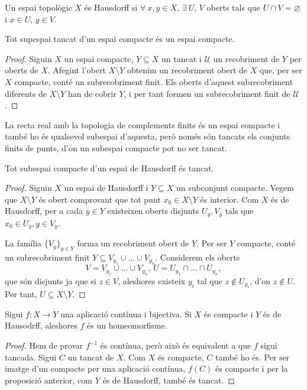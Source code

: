 \begin{defi}
    Un espai topològic $X$ \'es Hausdorff si $\forall \: x, y \in X, \, \exists \: U,\, V$
    oberts tals que $U \cap V = \varnothing$ i $x \in U,\, y \in V$.
\end{defi}
\begin{prop}
   Tot supespai tancat d'un espai compacte \'es un espai compacte. 
\end{prop}
\begin{proof}
    Siguin $X$ un espai compacte, $Y \subseteq X$ un tancat i $\mathcal{U}$ un recobriment
    de $Y$ per oberts de $X$. Afegint l'obert $X \setminus Y$ obtenim un 
    recobriment obert de $X$ que, per ser $X$ compacte, cont\'e un 
    subrecobriment finit. Els oberts d'aquest subrecobriment diferents 
    de $X \setminus Y$  han de cobrir $Y$, i per tant formen un subrecobriment finit de 
    $\mathcal{U}$.
\end{proof}
\begin{example}
    La recta real amb la topologia de complements finits \'es un espai compacte i tamb\'e ho
    \'es qualsevol subespai d'aquesta, però nom\'es són tancats els conjunts finits de punts,
    d'on un subespai compacte pot no ser tancat.
\end{example}
\begin{prop}
    Tot subespai compacte d'un espai de Hausdorff \'es tancat.
\end{prop}
\begin{proof}
    Siguin $X$ un espai de Hausdorff i $Y \subseteq X$ un subconjunt compacte. Vegem que
    $X \setminus Y$ \'es obert comprovant que tot punt $x_0 \in X \setminus Y$ \'es interior. Com $X$
    \'es de Hausdorff, per a cada $y \in Y$ existeixen oberts disjunts $U_y, V_y$ tals
    que $x_0 \in U_y, y \in V_y$.

    La família $\{V_y\}_{y \in Y}$ forma un recobriment obert de $Y$. Per ser $Y$ compacte,
    cont\'e un subrecobriment finit $Y \subseteq V_{y_1} \cup \dots \cup V_{y_n}$.
    Considerem els oberts
    \[ 
        V = V_{y_1} \cup \dots \cup V_{y_n}, \,
        U = U_{y_1} \cap \dots \cap U_{y_n},
    \]
    que són disjunts ja que si $z \in V$, aleshores 
    existeix $y_i$ tal que $z \not\in U_{y_i}$,
    d'on $z \not\in U$. Per tant, $U \subseteq X \setminus Y$.
\end{proof}
\begin{prop}
   Sigui $f : X \longrightarrow Y$ una aplicació contínua i bijectiva. Si $X$ \'es compacte
   i $Y$ \'es de Hausodrff, aleshores $f$ \'es un homeomorfisme.
\end{prop}
\begin{proof}
    Hem de provar $f^{-1}$ \'es contínua, però això \'es equivalent a que $f$ sigui tancada. 
    Sigui $C$ un tancat de $X$. Com $X$ \'es compacte, $C$ tamb\'e ho \'es. Per ser imatge
    d'un compacte per una aplicació contínua, $f(C)$ \'es compacte i per la
    proposició anterior, com $Y$ \'es de Hausdorff, tamb\'e \'es tancat.
\end{proof}

